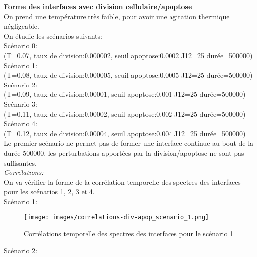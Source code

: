 \documentclass[11pt,a4paper]{article}
\begin{document}
\textbf{Forme des interfaces avec division cellulaire/apoptose}\\

On prend une température très faible, pour avoir une agitation thermique négligeable.\\

On étudie les scénarios suivants:\\

Scénario 0:\\
(T=0.07, taux de division:0.000002, seuil apoptose:0.0002  J12=25 durée=500000)\\


Scénario 1:\\
(T=0.08, taux de division:0.000005, seuil apoptose:0.0005  J12=25 durée=500000)\\

Scénario 2:\\
(T=0.09, taux de division:0.00001, seuil apoptose:0.001  J12=25 durée=500000)\\

Scénario 3:\\
(T=0.11, taux de division:0.00002, seuil apoptose:0.002  J12=25 durée=500000)\\

Scénario 4:\\
(T=0.12, taux de division:0.00004, seuil apoptose:0.004  J12=25 durée=500000)\\


Le premier scénario ne permet pas de former une interface continue au bout de la durée 500000. les perturbations apportées par la division/apoptose ne sont pas suffisantes.\\


\textit{Corrélations:}\\
On va vérifier la forme de la corrélation temporelle des spectres des interfaces pour les scénarios 1, 2, 3 et 4.\\

Scénario 1:\\

\begin{figure}[H]
\begin{center}
\texttt{[image: images/correlations-div-apop\_scenario\_1.png]}
\caption{Corrélations temporelle des spectres des interfaces pour le scénario 1}
\label{mafigure}
\end{center}
\end{figure}


Scénario 2:\\
\end{document}
